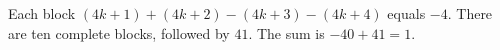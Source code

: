 Each block $(4k+1)+(4k+2)-(4k+3)-(4k+4)$ equals $-4$. There are ten complete blocks, followed by $41$. The sum is $-40+41=\boxed1$.
